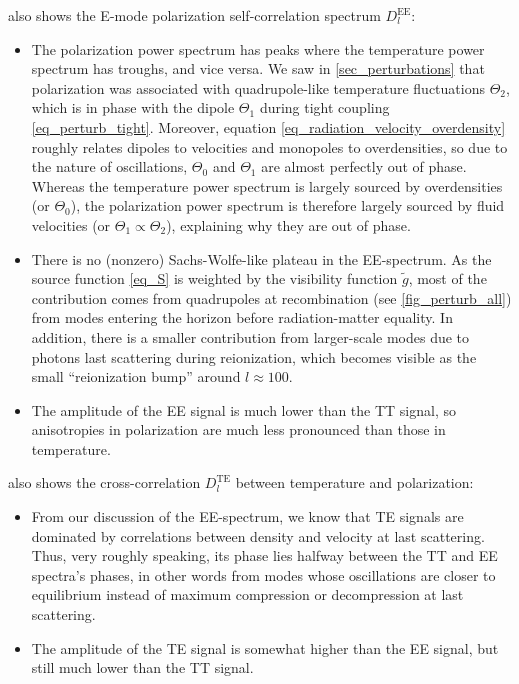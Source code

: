 \documentclass[10pt,a4paper]{article}
\begin{document}
 also shows the E-mode polarization self-correlation spectrum $D_l^\text{EE}$:
\begin{itemize}
\item
The polarization power spectrum has peaks where the temperature power spectrum has troughs, and vice versa.
We saw in \cref{sec_perturbations} that polarization was associated with quadrupole-like temperature fluctuations $\Theta_2$,
which is in phase with the dipole $\Theta_1$ during tight coupling \eqref{eq_perturb_tight}.
Moreover, equation \eqref{eq_radiation_velocity_overdensity} roughly relates dipoles to velocities and monopoles to overdensities,
so due to the nature of oscillations, $\Theta_0$ and $\Theta_1$ are almost perfectly out of phase.
Whereas the temperature power spectrum is largely sourced by overdensities (or $\Theta_0$),
the polarization power spectrum is therefore largely sourced by fluid velocities (or $\Theta_1 \propto \Theta_2$),
explaining why they are out of phase.

\item
There is no (nonzero) Sachs-Wolfe-like plateau in the EE-spectrum.
As the source function \eqref{eq_S} is weighted by the visibility function $\tilde{g}$,
most of the contribution comes from quadrupoles at recombination (see \cref{fig_perturb_all}) from modes entering the horizon before radiation-matter equality.
In addition, there is a smaller contribution from larger-scale modes due to photons last scattering during reionization,
which becomes visible as the small ``reionization bump'' around $l \approx 100$.

\item
The amplitude of the EE signal is much lower than the TT signal,
so anisotropies in polarization are much less pronounced than those in temperature.
\end{itemize}

 also shows the cross-correlation $D_l^\text{TE}$ between temperature and polarization:
\begin{itemize}
\item
From our discussion of the EE-spectrum,
we know that TE signals are dominated by correlations between density and velocity at last scattering.
Thus, very roughly speaking, its phase lies halfway between the TT and EE spectra's phases,
in other words from modes whose oscillations are closer to equilibrium instead of maximum compression or decompression at last scattering.

\item
The amplitude of the TE signal is somewhat higher than the EE signal,
but still much lower than the TT signal.
\end{itemize}
\end{document}
